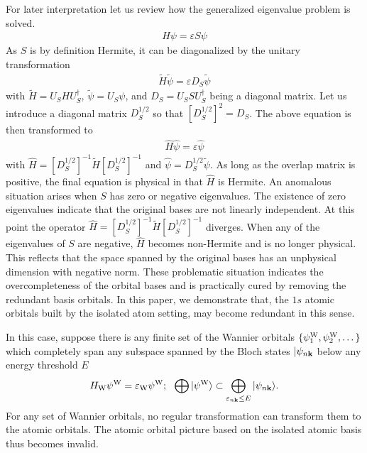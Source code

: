 \documentclass[twocolumn,showpacs,prb,amsfonts,amsmath,amssymb,floatfix,groupedaddress]{revtex4-1}
\begin{document}
For later interpretation let us review how the generalized eigenvalue problem is solved.
\begin{eqnarray}
H\psi = \varepsilon S\psi
\end{eqnarray}
As $S$ is by definition Hermite, it can be diagonalized by the unitary transformation
\begin{eqnarray}
\tilde{H}\tilde{\psi} = \varepsilon D_{S}\tilde{\psi}
\end{eqnarray}
with $\tilde{H}=U_{S}HU_{S}^{\dagger}$, $\tilde{\psi}=U_{S}\psi$, and $D_{S}=U_{S}SU_{S}^{\dagger}$ being a diagonal matrix. Let us introduce a diagonal matrix $D_{S}^{1/2}$ so that $\left[D_{S}^{1/2}\right]^2=D_{S}$. The above equation is then transformed to
\begin{eqnarray}
\hat{H}\hat{\psi}
=\varepsilon \hat{\psi}
\end{eqnarray}
with $\hat{H}=\left[D_{S}^{1/2}\right]^{-1}\tilde{H}\left[D_{S}^{1/2}\right]^{-1}$ and $\hat{\psi}=D_{S}^{1/2} \tilde{\psi}$. As long as the overlap matrix is positive, the final equation is physical in that $\hat{H}$ is Hermite. An anomalous situation arises when $S$ has zero or negative eigenvalues. The existence of zero eigenvalues indicate that the original bases are not linearly independent. At this point the operator $\hat{H}=\left[D_{S}^{1/2}\right]^{-1}\tilde{H}\left[D_{S}^{1/2}\right]^{-1}$ diverges. When any of the eigenvalues of $S$ are negative, $\hat{H}$ becomes non-Hermite and is no longer physical. This reflects that the space spanned by the original bases has an unphysical dimension with negative norm. These problematic situation indicates the overcompleteness of the orbital bases and is practically cured by removing the redundant basis orbitals. In this paper, we demonstrate that, the $1s$ atomic orbitals built by the isolated atom setting, may become redundant in this sense.

In this case, suppose there is any finite set of the Wannier orbitals $\{ \psi^{\rm W}_{1}, \psi^{\rm W}_{2}, \dots\}$ which completely span any subspace spanned by the Bloch states $|\psi_{n{\bf k}}$ below any energy threshold $E$
\begin{eqnarray}
H_{\rm W}\psi^{\rm W}=\varepsilon_{\rm W}\psi^{\rm W};\ \ 
\bigoplus |\psi^{\rm W}\rangle \subset \bigoplus_{\varepsilon_{n{\bf k}}\leq E} |\psi_{n{\bf k}}\rangle
.
\end{eqnarray}
For any set of Wannier orbitals, no regular transformation can transform them to the atomic orbitals. The atomic orbital picture based on the isolated atomic basis thus becomes invalid.
\end{document}
